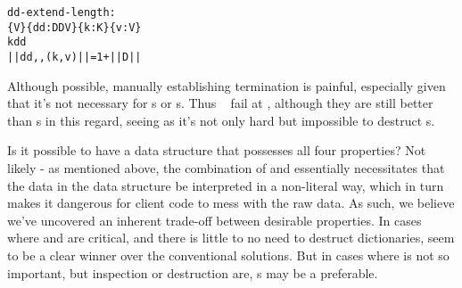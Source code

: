 \begin{alltt}
dd-extend-length :
  \altFAll\{V\} \{dd : DD V\} \{k : K\} \{v : V\} \altRArr
    k \altNIn dd \altRArr
    || dd ,, (k , v) || = 1 + || D ||
\end{alltt}

Although possible, manually establishing termination is painful, especially given that it's not necessary
for {\sal}s or {\cal}s. Thus \dds~ fail at \EzDstr, although they are still better than {\fpf}s in this
regard, seeing as it's not only hard but impossible to destruct {\fpf}s.

Is it possible to have a data structure that possesses all four properties?
Not likely - as mentioned above, the combination of \SemInj{} and \SemTot{} essentially
necessitates that the data in the data structure be interpreted in a non-literal way, which in turn
makes it dangerous for client code to mess with the raw data. As such, we believe we've uncovered an
inherent trade-off between desirable properties. In cases where \SemTot{} and \EqDec{} are critical,
and there is little to no need to destruct dictionaries, \dds{} seem to be a clear winner over
the conventional solutions. But in cases where \SemTot{} is not so important,
but inspection or destruction are, {\CAL}s may be a preferable.

